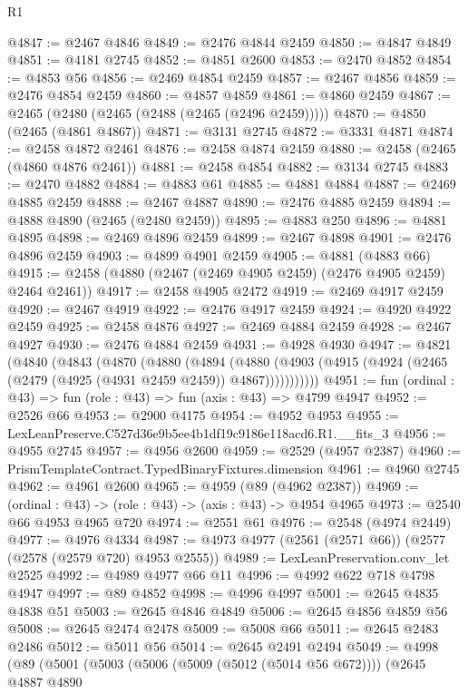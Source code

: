 \begin{lexlean}{R1}
\begin{coremodule}
@4847 := @2467 @4846
@4849 := @2476 @4844 @2459
@4850 := @4847 @4849
@4851 := @4181 @2745
@4852 := @4851 @2600
@4853 := @2470 @4852
@4854 := @4853 @56
@4856 := @2469 @4854 @2459
@4857 := @2467 @4856
@4859 := @2476 @4854 @2459
@4860 := @4857 @4859
@4861 := @4860 @2459
@4867 := @2465 (@2480 (@2465 (@2488 (@2465 (@2496 @2459)))))
@4870 := @4850 (@2465 (@4861 @4867))
@4871 := @3131 @2745
@4872 := @3331 @4871
@4874 := @2458 @4872 @2461
@4876 := @2458 @4874 @2459
@4880 := @2458 (@2465 (@4860 @4876 @2461))
@4881 := @2458 @4854
@4882 := @3134 @2745
@4883 := @2470 @4882
@4884 := @4883 @61
@4885 := @4881 @4884
@4887 := @2469 @4885 @2459
@4888 := @2467 @4887
@4890 := @2476 @4885 @2459
@4894 := @4888 @4890 (@2465 (@2480 @2459))
@4895 := @4883 @250
@4896 := @4881 @4895
@4898 := @2469 @4896 @2459
@4899 := @2467 @4898
@4901 := @2476 @4896 @2459
@4903 := @4899 @4901 @2459
@4905 := @4881 (@4883 @66)
@4915 := @2458 (@4880 (@2467 (@2469 @4905 @2459) (@2476 @4905 @2459) @2464 @2461))
@4917 := @2458 @4905 @2472
@4919 := @2469 @4917 @2459
@4920 := @2467 @4919
@4922 := @2476 @4917 @2459
@4924 := @4920 @4922 @2459
@4925 := @2458 @4876
@4927 := @2469 @4884 @2459
@4928 := @2467 @4927
@4930 := @2476 @4884 @2459
@4931 := @4928 @4930
@4947 := @4821
    (@4840
      (@4843
        (@4870
          (@4880
            (@4894
              (@4880 (@4903 (@4915 (@4924 (@2465 (@2479 (@4925 (@4931 @2459 @2459)) @4867)))))))))))
@4951 := fun (ordinal : @43) => fun (role : @43) => fun (axis : @43) => @4799 @4947
@4952 := @2526 @66
@4953 := @2900 @4175
@4954 := @4952 @4953
@4955 := LexLeanPreserve.C527d36e9b5ee4b1df19c9186e118acd6.R1.__fits_3
@4956 := @4955 @2745
@4957 := @4956 @2600
@4959 := @2529 (@4957 @2387)
@4960 := PrismTemplateContract.TypedBinaryFixtures.dimension
@4961 := @4960 @2745
@4962 := @4961 @2600
@4965 := @4959 (@89 (@4962 @2387))
@4969 := (ordinal : @43) -> (role : @43) -> (axis : @43) -> @4954 @4965
@4973 := @2540 @66 @4953 @4965 @720
@4974 := @2551 @61
@4976 := @2548 (@4974 @2449)
@4977 := @4976 @4334
@4987 := @4973 @4977 (@2561 (@2571 @66)) (@2577 (@2578 (@2579 @720) @4953 @2555))
@4989 := LexLeanPreservation.conv_let @2525
@4992 := @4989 @4977 @66 @11
@4996 := @4992 @622 @718 @4798 @4947
@4997 := @89 @4852
@4998 := @4996 @4997
@5001 := @2645 @4835 @4838 @51
@5003 := @2645 @4846 @4849
@5006 := @2645 @4856 @4859 @56
@5008 := @2645 @2474 @2478
@5009 := @5008 @66
@5011 := @2645 @2483 @2486
@5012 := @5011 @56
@5014 := @2645 @2491 @2494
@5049 := @4998
    (@89
      (@5001
        (@5003
          (@5006 (@5009 (@5012 (@5014 @56 @672))))
          (@2645
            @4887
            @4890

\end{coremodule}
\end{lexlean}
